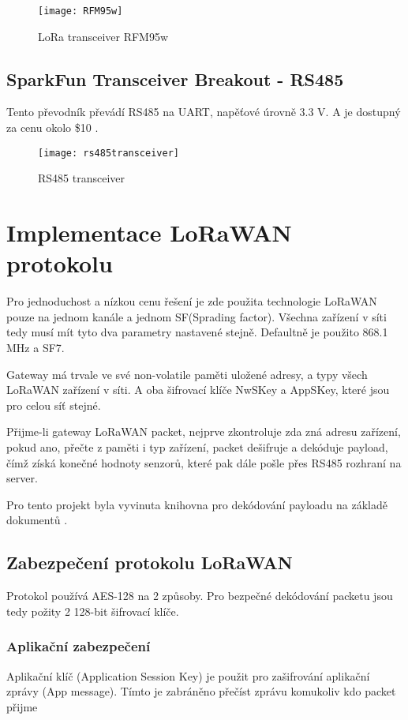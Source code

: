 \begin{figure}[!h]
    \centering
    \texttt{[image: RFM95w]}
    \caption{LoRa transceiver RFM95w \cite{RFM95w}}
    \label{fig:02}
\end{figure}


\subsection{SparkFun Transceiver Breakout - RS485}
Tento převodník převádí RS485 na UART, napěťové úrovně 3.3 V. A je dostupný za cenu okolo \$10 \cite{rs485tr}.

\begin{figure}[!h]
    \centering
    \texttt{[image: rs485transceiver]}
    \caption{RS485 transceiver \cite{rs485tr}}
    \label{fig:rs485transceiver}
\end{figure}



\newpage
\section{Implementace LoRaWAN protokolu}
Pro jednoduchost a nízkou cenu řešení je zde použita technologie LoRaWAN pouze na jednom kanále a jednom SF(Sprading factor). Všechna zařízení v síti tedy musí mít tyto dva parametry nastavené stejně. Defaultně je použito 868.1 MHz a SF7.

Gateway má trvale ve své non-volatile paměti uložené adresy, a typy všech LoRaWAN zařízení v síti. A oba šifrovací klíče NwSKey a AppSKey, které jsou pro celou síť stejné.

Přijme-li gateway LoRaWAN packet, nejprve zkontroluje zda zná adresu zařízení, pokud ano, přečte z paměti i typ zařízení, packet dešifruje a dekóduje payload, čímž získá konečné hodnoty senzorů, které pak dále pošle přes RS485 rozhraní na server.

Pro tento projekt byla vyvinuta knihovna pro dekódování payloadu na základě dokumentů \cite{lwSpec} \cite{lwSecur}.

\subsection{Zabezpečení protokolu LoRaWAN}
Protokol používá AES-128 na 2 způsoby. Pro bezpečné dekódování packetu jsou tedy požity 2 128-bit šifrovací klíče.

\subsubsection{Aplikační zabezpečení}
Aplikační klíč (Application Session Key) je použit pro zašifrování aplikační zprávy (App message). Tímto je zabráněno přečíst zprávu komukoliv kdo packet přijme 


